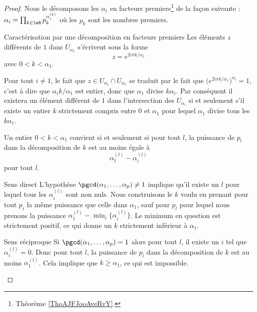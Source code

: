 \begin{proof}
    Nous le décomposons les \( \alpha_i\) en facteurs premiers\footnote{Théorème \ref{ThoAJFJooAveRvY}.} de la façon suivante : \( \alpha_i=\prod_{k\in \eN}p_k^{\alpha_i^{(k)}}\) où les \( p_k\) sont les nombres premiers. 
    
    \begin{subproof}
    \item[Caractérisation par une décomposition en facteurs premiers]
        Les éléments \( z\) différents de \( 1\) dans \( U_{\alpha_1}\) s'écrivent sous la forme
        \begin{equation}
            z= e^{2i\pi k/\alpha_1}
        \end{equation}
        avec \( 0<k<\alpha_1\).

        Pour tout \( i\neq 1\), le fait que \( z\in U_{\alpha_i}\cap U_{\alpha_1}\) se traduit par le fait que \( \big(  e^{2i\pi k/\alpha_1} \big)^{\alpha_i}=1\), c'est à dire que \( \alpha_ik/\alpha_1\) est entier, donc que \( \alpha_1\) divise \( k\alpha_i\). Par conséquent il existera un élément différent de \( 1\) dans l'intersection des \( U_{\alpha_i}\) si et seulement s'il existe un entier \( k\) strictement compris entre \( 0\) et \( \alpha_1\) pour lequel \( \alpha_1\) divise tous les \( k\alpha_i\).

        Un entier \( 0<k<\alpha_1\) convient si et seulement si pour tout \( l\), la puissance de \( p_l\) dans la décomposition de \( k\) est au moins égale à
        \begin{equation}
            \alpha_1^{(l)}-\alpha_i^{(l)}
        \end{equation}
        pour tout \( l\).
    \item[Sens direct]
        L'hypothèse \( \pgcd(\alpha_1,\ldots, \alpha_p)\neq 1\) implique qu'il existe un \( l\) pour lequel tous les \( \alpha_i^{(l)}\) sont non nuls. Nous construisons le \( k\) voulu en prenant pour tout \( p_i\) la même puissance que celle dans \( \alpha_1\), sauf pour \( p_l\) pour lequel nous prenons la puissance \(  \alpha_1^{(l)}-\min_i\{   \alpha_i^{(l)} \} \). Le minimum en question est strictement positif, ce qui donne un \( k\) strictement inférieur à \( \alpha_1\).
    \item[Sens réciproque]
        Si \( \pgcd(\alpha_1,\ldots, \alpha_p)=1\) alors pour tout \( l\), il existe un \( i\) tel que \( \alpha_i^{(l)}=0\). Donc pour tout \( l\), la puissance de \( p_l\) dans la décomposition de \( k\) est au moins \( \alpha_1^{(l)}\). Cela implique que \( k\geq \alpha_1\), ce qui est impossible.
    \end{subproof}
\end{proof}

